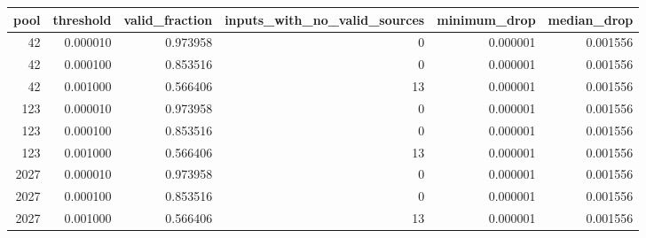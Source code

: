 \begin{tabular}{rrrrrr}
\toprule
pool & threshold & valid_fraction & inputs_with_no_valid_sources & minimum_drop & median_drop \\
\midrule
42 & 0.000010 & 0.973958 & 0 & 0.000001 & 0.001556 \\
42 & 0.000100 & 0.853516 & 0 & 0.000001 & 0.001556 \\
42 & 0.001000 & 0.566406 & 13 & 0.000001 & 0.001556 \\
123 & 0.000010 & 0.973958 & 0 & 0.000001 & 0.001556 \\
123 & 0.000100 & 0.853516 & 0 & 0.000001 & 0.001556 \\
123 & 0.001000 & 0.566406 & 13 & 0.000001 & 0.001556 \\
2027 & 0.000010 & 0.973958 & 0 & 0.000001 & 0.001556 \\
2027 & 0.000100 & 0.853516 & 0 & 0.000001 & 0.001556 \\
2027 & 0.001000 & 0.566406 & 13 & 0.000001 & 0.001556 \\
\bottomrule
\end{tabular}
